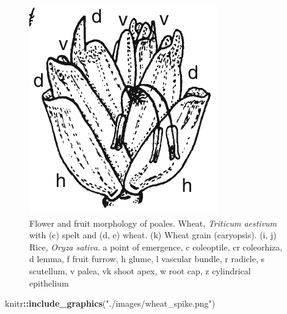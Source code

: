 \documentclass[]{article}
\newenvironment{Shaded}{\begin{snugshade}}{\end{snugshade}}
\newcommand{\KeywordTok}[1]{\textcolor[rgb]{0.13,0.29,0.53}{\textbf{#1}}}
\newcommand{\NormalTok}[1]{#1}
\newcommand{\OperatorTok}[1]{\textcolor[rgb]{0.81,0.36,0.00}{\textbf{#1}}}
\newcommand{\StringTok}[1]{\textcolor[rgb]{0.31,0.60,0.02}{#1}}
\begin{document}
\begin{figure}

{\centering \includegraphics[width=0.8\linewidth]{./images/wheat_spikelet} 

}

\caption{Flower and fruit morphology of poales. Wheat, \textit{Triticum aestivum} with (c) spelt and (d, e) wheat. (k) Wheat grain (caryopsis). (i, j) Rice, \textit{Oryza sativa}. a point of emergence, c coleoptile, cr coleorhiza, d lemma, f fruit furrow, h glume, l vascular bundle, r radicle, s scutellum, v palea, vk shoot apex, w root cap, z cylindrical epithelium}\label{fig:floral-morphology-poales}
\end{figure}

\begin{Shaded}
\begin{Highlighting}[]
\NormalTok{knitr}\OperatorTok{::}\KeywordTok{include_graphics}\NormalTok{(}\StringTok{"./images/wheat_spike.png"}\NormalTok{)}
\end{Highlighting}
\end{Shaded}
\end{document}

